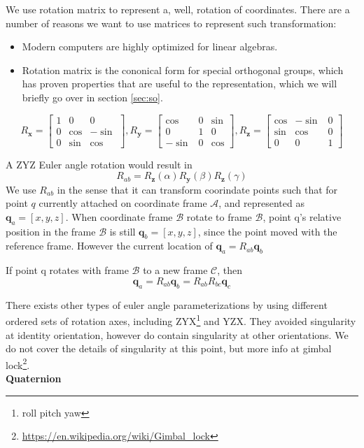 \documentclass[letterpaper]{article}
\begin{document}
We use rotation matrix to represent a, well, rotation of coordinates. There are a number of reasons we want
to use matrices to represent such transformation:
\begin{itemize}
  \item Modern computers are highly optimized for linear algebras. \vspace{-0.5em}
  \item Rotation matrix is the cononical form for special orthogonal groups, which has proven properties
    that are useful to the representation, which we will briefly go over in section \ref{sec:so}.
\end{itemize}
\begin{equation} \label{eqn:rotmat_init}
R_{\mathbf{x}} = \begin{bmatrix}
  1 & 0 & 0\\
  0 &\cos & -\sin\\
  0 &\sin & \cos
\end{bmatrix}, 
R_{\mathbf{y}} = \begin{bmatrix}
\cos & 0 & \sin\\
0 & 1 & 0\\
-\sin & 0 & \cos
\end{bmatrix}, 
R_{\mathbf{z}} = \begin{bmatrix}
  \cos & -\sin & 0\\
  \sin & \cos & 0\\
  0 & 0 & 1
\end{bmatrix}
\end{equation}
\vspace{6pt}

A ZYZ Euler angle rotation would result in
$$ R_{ab} = R_{\mathbf{z}}(\alpha) R_{\mathbf{y}}(\beta) R_{\mathbf{z}}(\gamma) $$
We use $R_{ab}$ in the sense that it can transform coorindate points such that for point $q$ currently attached
on coordinate frame $\mathcal{A}$, and represented as $\mathbf{q}_a = [x, y ,z]$. When coordinate frame $\mathcal{B}$
rotate to frame $\mathcal{B}$, point q's relative position in the frame $\mathcal{B}$ is still $\mathbf{q}_b = [x, y, z]$, since the point
moved with the reference frame. However the current location of $\mathbf{q}_a = R_{ab} \mathbf{q}_b$

If point q rotates with frame $\mathcal{B}$ to a new frame $\mathcal{C}$, then 
$$\mathbf{q}_a = R_{ab}\mathbf{q}_b = R_{ab}R_{bc}\mathbf{q}_c$$

There exists other types of euler angle parameterizations by using different ordered sets of rotation axes,
including ZYX\footnote{roll pitch yaw} and YZX. They avoided singularity at identity orientation, however do contain
singularity at other orientations. We do not cover the details of singularity at this point, but more info at gimbal
lock\footnote{\url{https://en.wikipedia.org/wiki/Gimbal_lock}}. \vspace{1em}\\
\textbf{Quaternion}
\end{document}
